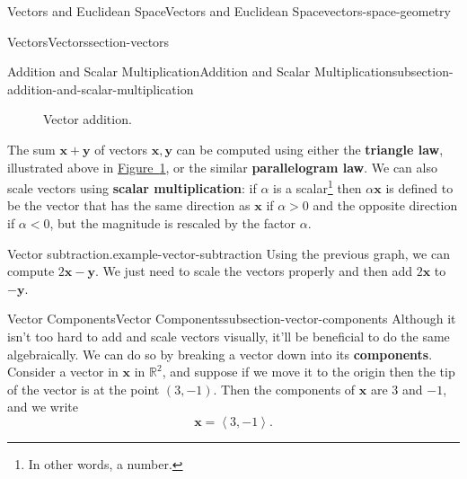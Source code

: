 \documentclass[oneside,10pt,]{book}
\newcommand{\terminology}[1]{\textbf{#1}}
\numberwithin{equation}{section}
\newcommand{\RR}{\mathbb{R}}
\newcommand{\vv}[1]{\mathbf{#1}}
\newcommand{\dotprod}[1]{\left\langle #1 \right\rangle}
\begin{document}
\begin{chapterptx}{Vectors and Euclidean Space}{}{Vectors and Euclidean Space}{}{}{vectors-space-geometry}
\begin{sectionptx}{Vectors}{}{Vectors}{}{}{section-vectors}
\begin{subsectionptx}{Addition and Scalar Multiplication}{}{Addition and Scalar Multiplication}{}{}{subsection-addition-and-scalar-multiplication}
\begin{figure}
{
}
\caption{Vector addition.\label{figure-vector-addition}}
\end{figure}
\hypertarget{p-1086}{}%
The sum \(\vv{x}+\vv{y}\) of vectors \(\vv{x},\vv{y}\) can be computed using either the \terminology{triangle law}, illustrated above in \hyperref[figure-vector-addition]{Figure~\ref{figure-vector-addition}}, or the similar \terminology{parallelogram law}. We can also scale vectors using \terminology{scalar multiplication}: if \(\alpha\) is a scalar\footnote{In other words, a number.\label{fn-2}} then \(\alpha\vv{x}\) is defined to be the vector that has the same direction as \(\vv{x}\) if \(\alpha>0\) and the opposite direction if \(\alpha<0\), but the magnitude is rescaled by the factor \(\alpha\).%
\begin{example}{Vector subtraction.}{example-vector-subtraction}%
\hypertarget{p-1087}{}%
Using the previous graph, we can compute \(2\vv{x}-\vv{y}\). We just need to scale the vectors properly and then add \(2\vv{x}\) to \(-\vv{y}\).%
\end{example}
\end{subsectionptx}
%
%
\typeout{************************************************}
\typeout{************************************************}
%
\begin{subsectionptx}{Vector Components}{}{Vector Components}{}{}{subsection-vector-components}
\hypertarget{p-1088}{}%
Although it isn't too hard to add and scale vectors visually, it'll be beneficial to do the same algebraically. We can do so by breaking a vector down into its \terminology{components}. Consider a vector in \(\vv{x}\) in \(\RR^{2}\), and suppose if we move it to the origin then the tip of the vector is at the point \((3,-1)\). Then the components of \(\vv{x}\) are \(3\) and \(-1\), and we write%
\begin{equation*}
\vv{x} = \dotprod{3,-1}.
\end{equation*}
%
\par
\hypertarget{p-1089}{}%

\end{subsectionptx}
\end{sectionptx}
\end{chapterptx}
\end{document}

